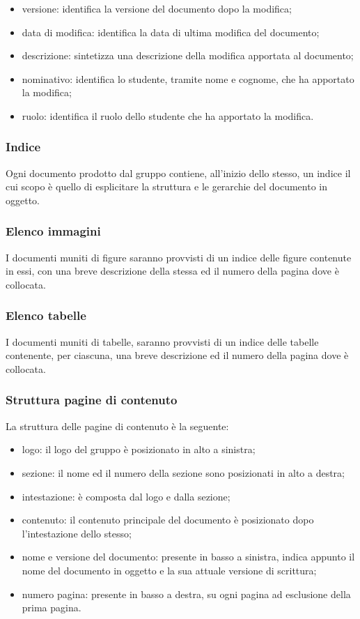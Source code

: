 \begin{itemize}
	\item versione: identifica la versione del documento dopo la modifica;
	\item data di modifica: identifica la data di ultima modifica del documento;
	\item descrizione: sintetizza una descrizione della modifica apportata al documento;
	\item nominativo: identifica lo studente, tramite nome e cognome, che ha apportato la modifica;
	\item ruolo: identifica il ruolo dello studente che ha apportato la modifica.
\end{itemize}

\subsubsection{Indice}
Ogni documento prodotto dal gruppo {\Gruppo} contiene, all’inizio dello stesso, un indice il cui scopo è quello di esplicitare la struttura e le gerarchie del documento in oggetto. 

\subsubsection{Elenco immagini}
I documenti muniti di figure saranno provvisti di un indice delle figure contenute in essi, con una breve descrizione della stessa ed il numero della pagina dove è collocata.


\subsubsection{Elenco tabelle}
I documenti muniti di tabelle, saranno provvisti di un indice delle tabelle contenente, per
ciascuna, una breve descrizione ed il numero della pagina dove è collocata.

\subsubsection{Struttura pagine di contenuto}
La struttura delle pagine di contenuto è la seguente:
\begin{itemize}
	\item logo: il logo del gruppo è posizionato in alto a sinistra;
	\item sezione: il nome ed il numero della sezione sono posizionati in alto a destra;
	\item intestazione: è composta dal logo e dalla sezione;
	\item contenuto: il contenuto principale del documento è posizionato dopo l’intestazione dello stesso;
	\item nome e versione del documento: presente in basso a sinistra, indica appunto il nome del documento in oggetto e la sua attuale versione di scrittura;

	\item numero pagina: presente in basso a destra, su ogni pagina ad esclusione della prima pagina.
\end{itemize}




